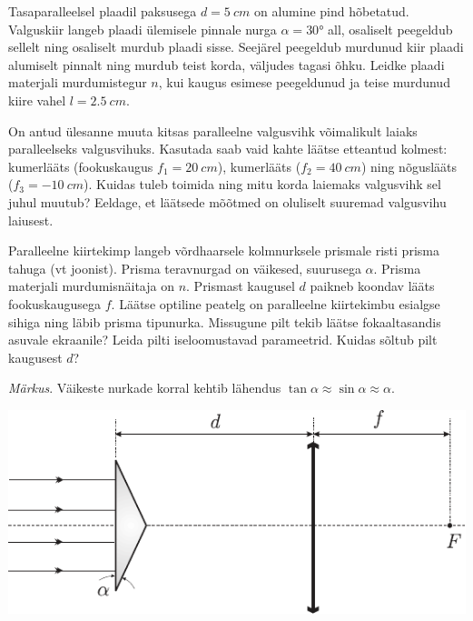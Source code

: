 \documentclass[10pt, twoside]{article}
\begin{document}
{%

Tasaparalleelsel plaadil paksusega $d = \SI{5}{cm}$ on alumine pind hõbetatud. Valguskiir langeb plaadi ülemisele pinnale nurga $\alpha = \ang{30}$ all, osaliselt peegeldub sellelt ning osaliselt murdub plaadi sisse. Seejärel peegeldub murdunud kiir plaadi alumiselt pinnalt ning murdub teist korda, väljudes tagasi õhku. Leidke plaadi materjali murdumistegur $n$, kui kaugus esimese peegeldunud ja teise murdunud kiire vahel $l = \SI{2,5}{cm}$.
\probend
\bigskip


On antud ülesanne muuta kitsas paralleelne valgusvihk võimalikult laiaks paralleelseks valgusvihuks. Kasutada saab vaid kahte läätse etteantud kolmest: kumerlääts (fookuskaugus $f_1 = \SI{20}{cm}$), kumerlääts ($f_2 = \SI{40}{cm}$) ning nõguslääts ($f_3 = \SI{-10}{cm}$). Kuidas tuleb toimida ning mitu korda laiemaks valgusvihk sel juhul muutub? Eeldage, et läätsede mõõtmed on oluliselt suuremad valgusvihu laiusest.
\probend
\bigskip


Paralleelne kiirtekimp langeb võrdhaarsele kolmnurksele prismale risti prisma tahuga (vt joonist). Prisma teravnurgad on väikesed, suurusega $\alpha$. Prisma materjali murdumisnäitaja on $n$. Prismast kaugusel $d$ paikneb koondav lääts fookuskaugusega $f$. Läätse optiline peatelg on paralleelne kiirtekimbu esialgse sihiga ning läbib prisma tipunurka. Missugune pilt tekib läätse fokaaltasandis asuvale ekraanile? Leida pilti iseloomustavad parameetrid. Kuidas sõltub pilt kaugusest $d$? 

\emph{Märkus}. Väikeste nurkade korral kehtib lähendus $\tan \alpha \approx \sin \alpha \approx \alpha$.

\begin{center}
	\includegraphics[width=\linewidth]{2006-v2g-06-yl}
\end{center}
\probend
\bigskip

}
\end{document}
